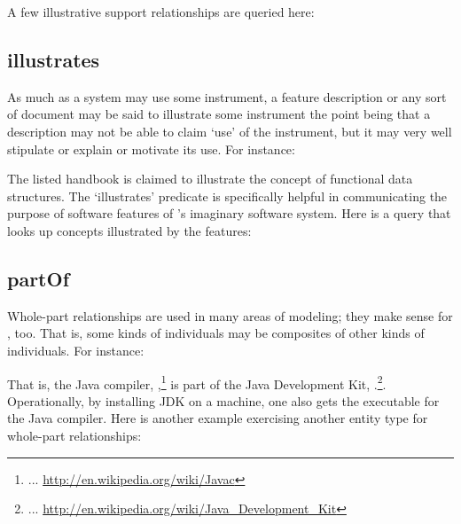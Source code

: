 \noindent
A few illustrative support relationships are queried here:




\subsection{illustrates}
\label{S:illustrates}

As much as a system may use some instrument, a feature description or
any sort of document may be said to illustrate some instrument the
point being that a description may not be able to claim `use' of the
instrument, but it may very well stipulate or explain or motivate its
use. For instance:


\noindent
The listed handbook is claimed to illustrate the concept of functional
data structures. The `illustrates' predicate is specifically helpful
in communicating the purpose of software features of \ooo{}'s
imaginary software system. Here is a query that looks up concepts
illustrated by the features:




\subsection{partOf}
\label{S:partOf}

Whole-part relationships are used in many areas of modeling; they make
sense for \solasote, too. That is, some kinds of \solasote{}
individuals may be composites of other kinds of \solasote{}
individuals. For instance:


\noindent
That is, the Java compiler,
,\footnote{... 
  \url{http://en.wikipedia.org/wiki/Javac}} is part of the Java
Development Kit, .\footnote{... 
  \url{http://en.wikipedia.org/wiki/Java_Development_Kit}}. Operationally,
by installing JDK on a machine, one also gets the executable for the
Java compiler. Here is another example exercising another entity type
for whole-part relationships:


